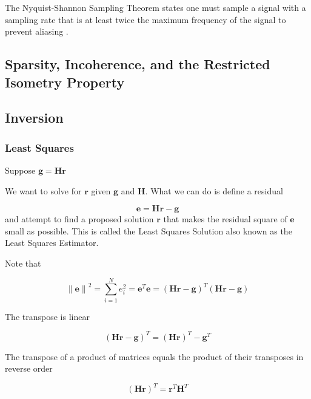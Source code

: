 The Nyquist-Shannon Sampling Theorem states one must sample a signal with a sampling rate that is at least twice the maximum frequency of the signal to prevent aliasing \cite{shannon1949communication}.


\subsection{Sparsity, Incoherence, and the Restricted Isometry Property}

\subsection{Inversion}

\subsubsection{Least Squares}

Suppose $\mathbf{g} = \mathbf{H} \mathbf{r}$

We want to solve for $\mathbf{r}$ given $\mathbf{g}$ and $\mathbf{H}$. What we can do is define a residual

\begin{equation}
	\mathbf{e} = \mathbf{Hr-g}
\end{equation}
and attempt to find a proposed solution $\mathbf{r}$ that makes the residual square of $\mathbf{e}$ small as possible. This is called the Least Squares Solution also known as the Least Squares Estimator. 

Note that 

\begin{equation}
	\mathbf{ \lVert \mathbf{e} \rVert }^2 =  \sum_{i=1}^{N} e_i^{2} = \mathbf{e}^T \mathbf{e} =( \mathbf{Hr-g} ) ^{T} ( \mathbf{Hr-g} )
\end{equation}

The transpose is linear 

\begin{equation}
	 ( \mathbf{Hr-g} )^{T} = ( \mathbf{Hr} )^{T} - \mathbf{g}^{T} 
\end{equation}

The transpose of a product of matrices equals the product of their transposes in reverse order

\begin{equation}
	 ( \mathbf{Hr} )^{T} = \mathbf{r}^{T} \mathbf{H}^{T} 
\end{equation}


